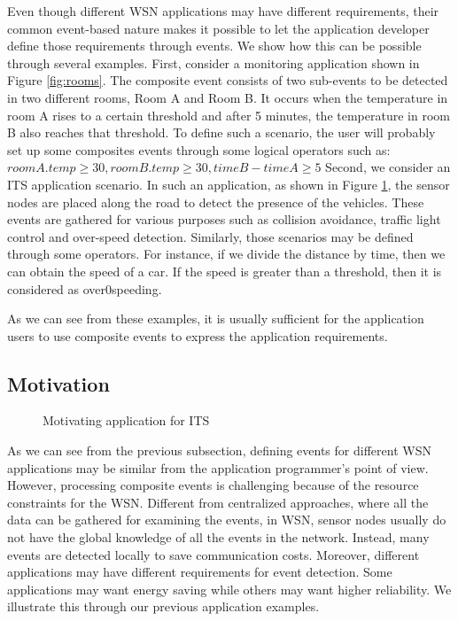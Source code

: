 Even though different WSN applications may have different requirements, their common event-based nature makes it possible to let the application developer define those requirements through events. We show how this can be possible through several examples. First, consider a monitoring application shown in Figure \ref{fig:rooms}. The composite event consists of two sub-events to be detected in two different rooms, Room A and Room B. It occurs when the temperature in room A rises to a certain threshold and after 5 minutes, the temperature in room B also reaches that threshold. To define such a scenario, the user will probably set up some composites events through some logical operators such as: \(roomA.temp \geq 30, roomB.temp \geq 30, timeB - timeA \geq 5\) Second, we consider an ITS application scenario. In such an application, as shown in Figure \ref{fig:its}, the sensor nodes are placed along the road to detect the presence of the vehicles. These events are gathered for various purposes such as collision avoidance, traffic light control and over-speed detection. Similarly, those scenarios may be defined through some operators. For instance, if we divide the distance by time, then we can obtain the speed of a car. If the speed is greater than a threshold, then it is considered as over0speeding.

As we can see from these examples, it is usually sufficient for the application users to use composite events to express the application requirements.

\subsection{Motivation}

\begin{figure}
\centering
{}
\caption{Motivating application for ITS}
\label{fig:its}
\end{figure}

As we can see from the previous subsection, defining events for different WSN applications may be similar from the application programmer's point of view. However, processing composite events is challenging because of the resource constraints for the WSN. Different from centralized approaches, where all the data can be gathered for examining the events, in WSN, sensor nodes usually do not have the global knowledge of all the events in the network. Instead, many events are detected locally to save communication costs. Moreover, different applications may have different requirements for event detection. Some applications may want energy saving while others may want higher reliability. We illustrate this through our previous application examples.

